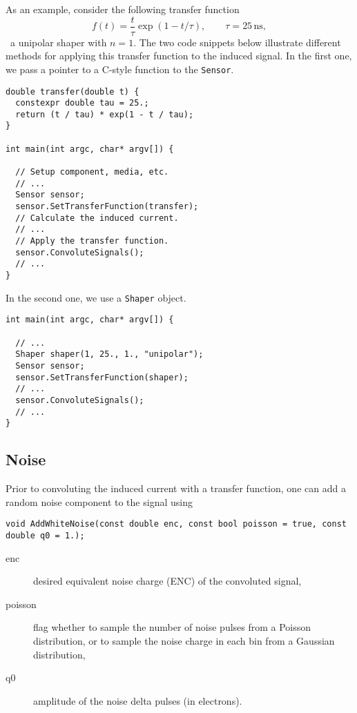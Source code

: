 As an example, consider the following transfer function
\begin{equation*}
  f\left(t\right) = \frac{t}{\tau}\exp\left(1 - t/\tau\right), \qquad
  \tau = 25\,\text{ns},
\end{equation*}
\ie~a unipolar shaper with $n = 1$. The two code snippets 
below illustrate different methods for applying this transfer function 
to the induced signal. In the first one, we pass a pointer to a 
C-style function to the \texttt{Sensor}.
\begin{lstlisting}
double transfer(double t) {
  constexpr double tau = 25.;
  return (t / tau) * exp(1 - t / tau);
}

int main(int argc, char* argv[]) {

  // Setup component, media, etc.
  // ...
  Sensor sensor;
  sensor.SetTransferFunction(transfer);
  // Calculate the induced current.
  // ...
  // Apply the transfer function.
  sensor.ConvoluteSignals();
  // ...
}
\end{lstlisting}

In the second one, we use a \texttt{Shaper} object.
\begin{lstlisting}
int main(int argc, char* argv[]) {

  // ...
  Shaper shaper(1, 25., 1., "unipolar");
  Sensor sensor;
  sensor.SetTransferFunction(shaper);
  // ...
  sensor.ConvoluteSignals();
  // ...
}
\end{lstlisting}

\subsection{Noise}
Prior to convoluting the induced current with a transfer function, 
one can add a random noise component to the signal using 
\begin{lstlisting}
void AddWhiteNoise(const double enc, const bool poisson = true, const double q0 = 1.);
\end{lstlisting}
\begin{description}
  \item[enc] desired equivalent noise charge (ENC) of the convoluted signal,
  \item[poisson] flag whether to sample the number of noise pulses 
    from a Poisson distribution, or to sample the noise charge in each 
    bin from a Gaussian distribution,
  \item[q0] amplitude of the noise delta pulses (in electrons). 
\end{description} 

